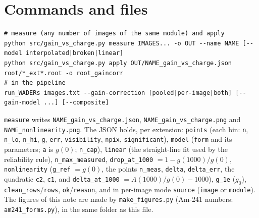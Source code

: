 \documentclass[11pt,a4paper]{article}
\newcommand{\code}[1]{\texttt{#1}}
\begin{document}
\section{Commands and files}
\begin{verbatim}
# measure (any number of images of the same module) and apply
python src/gain_vs_charge.py measure IMAGES... -o OUT --name NAME [--model interpolated|broken|linear]
python src/gain_vs_charge.py apply OUT/NAME_gain_vs_charge.json root/*_ext*.root -o root_gaincorr
# in the pipeline
run_WADERs images.txt --gain-correction [pooled|per-image|both] [--gain-model ...] [--composite]
\end{verbatim}
\code{measure} writes \code{NAME\_gain\_vs\_charge.json}, \code{NAME\_gain\_vs\_charge.png} and
\code{NAME\_nonlinearity.png}. The JSON holds, per extension: \code{points} (each bin: \code{n}, \code{n\_lo},
\code{n\_hi}, \code{g}, \code{err}, \code{visibility}, \code{npix}, \code{significant}), \code{model} (\code{form}
and its parameters; \code{a} is $g(0)$; \code{n\_cap}), \code{linear} (the straight-line fit used by the
reliability rule), \code{n\_max\_measured}, \code{drop\_at\_1000} $= 1 - g(1000)/g(0)$, \code{nonlinearity}
(\code{g\_ref} $= g(0)$, the points \code{n\_meas}, \code{delta}, \code{delta\_err}, the quadratic \code{c2},
\code{c1}, and \code{delta\_at\_1000} $= A(1000)/g(0) - 1000$), \code{g\_1e} ($g_0$),
\code{clean\_rows}/\code{rows}, \code{ok}/\code{reason}, and in per-image mode \code{source} (\code{image} or
\code{module}). The figures of this note are made by \code{make\_figures.py} (Am-241 numbers:
\code{am241\_forms.py}), in the same folder as this file.
\end{document}
